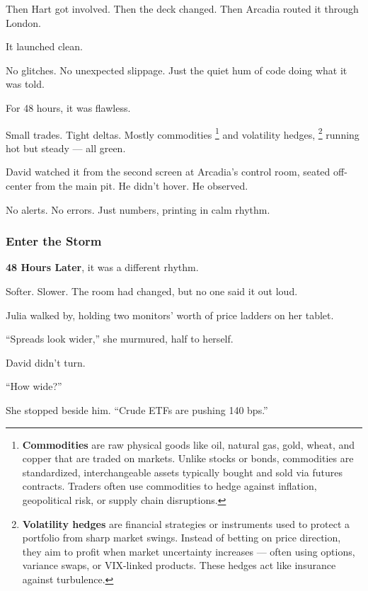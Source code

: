 \medskip

  



Then Hart got involved.
Then the deck changed.
Then Arcadia routed it through London.

It launched clean.

No glitches. No unexpected slippage.
Just the quiet hum of code doing what it was told.

For 48 hours, it was flawless.

Small trades.
Tight deltas.
Mostly commodities
\footnote{\textbf{Commodities} are raw physical goods like oil, natural gas, gold, wheat, and copper that are traded 
on markets. Unlike stocks or bonds, commodities are standardized, interchangeable assets typically bought and sold via 
futures contracts. Traders often use commodities to hedge against inflation, geopolitical risk, or supply chain 
disruptions.}
and volatility hedges, 
\footnote{\textbf{Volatility hedges} are financial strategies or instruments used to protect a portfolio from sharp market 
swings. Instead of betting on price direction, they aim to profit when market uncertainty increases — often using options, 
variance swaps, or VIX-linked products. These hedges act like insurance against turbulence.}
running hot but steady — all green.

David watched it from the second screen at Arcadia’s control room, seated off-center from the main pit.
He didn’t hover.
He observed.

No alerts. No errors.
Just numbers, printing in calm rhythm.



\subsubsection{Enter the Storm}

\textbf{48 Hours Later}, it was a different rhythm.

Softer. Slower.
The room had changed, but no one said it out loud.

Julia walked by, holding two monitors’ worth of price ladders on her tablet.

“Spreads look wider,” she murmured, half to herself.

David didn’t turn.

“How wide?”

She stopped beside him. “Crude ETFs are pushing 140 bps.”

\medskip

